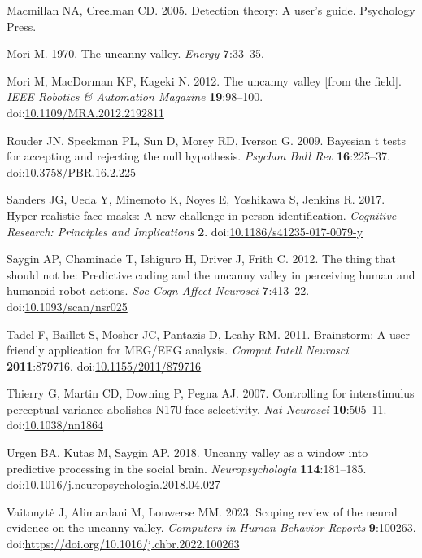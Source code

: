 \documentclass[
]{article}
\newlength{\cslhangindent}
\newlength{\cslentryspacingunit} %
\newenvironment{CSLReferences}[2] %
 {%
  \setlength{\parindent}{0pt}
  \ifodd #1
  \let\oldpar\par
  \def\par{\hangindent=\cslhangindent\oldpar}
  \fi
  \setlength{\parskip}{#2\cslentryspacingunit}
 }%
 {}
\begin{document}
\begin{CSLReferences}{1}{0}
\leavevmode{}%
Macmillan NA, Creelman CD. 2005. Detection theory: A user's guide. Psychology Press.

\leavevmode{}%
Mori M. 1970. The uncanny valley. \emph{Energy} \textbf{7}:33--35.

\leavevmode{}%
Mori M, MacDorman KF, Kageki N. 2012. The uncanny valley {[}from the field{]}. \emph{IEEE Robotics \& Automation Magazine} \textbf{19}:98--100. doi:\href{https://doi.org/10.1109/MRA.2012.2192811}{10.1109/MRA.2012.2192811}

\leavevmode{}%
Rouder JN, Speckman PL, Sun D, Morey RD, Iverson G. 2009. Bayesian t tests for accepting and rejecting the null hypothesis. \emph{Psychon Bull Rev} \textbf{16}:225--37. doi:\href{https://doi.org/10.3758/PBR.16.2.225}{10.3758/PBR.16.2.225}

\leavevmode{}%
Sanders JG, Ueda Y, Minemoto K, Noyes E, Yoshikawa S, Jenkins R. 2017. Hyper-realistic face masks: A new challenge in person identification. \emph{Cognitive Research: Principles and Implications} \textbf{2}. doi:\href{https://doi.org/10.1186/s41235-017-0079-y}{10.1186/s41235-017-0079-y}

\leavevmode{}%
Saygin AP, Chaminade T, Ishiguro H, Driver J, Frith C. 2012. The thing that should not be: Predictive coding and the uncanny valley in perceiving human and humanoid robot actions. \emph{Soc Cogn Affect Neurosci} \textbf{7}:413--22. doi:\href{https://doi.org/10.1093/scan/nsr025}{10.1093/scan/nsr025}

\leavevmode{}%
Tadel F, Baillet S, Mosher JC, Pantazis D, Leahy RM. 2011. Brainstorm: A user-friendly application for MEG/EEG analysis. \emph{Comput Intell Neurosci} \textbf{2011}:879716. doi:\href{https://doi.org/10.1155/2011/879716}{10.1155/2011/879716}

\leavevmode{}%
Thierry G, Martin CD, Downing P, Pegna AJ. 2007. Controlling for interstimulus perceptual variance abolishes N170 face selectivity. \emph{Nat Neurosci} \textbf{10}:505--11. doi:\href{https://doi.org/10.1038/nn1864}{10.1038/nn1864}

\leavevmode{}%
Urgen BA, Kutas M, Saygin AP. 2018. Uncanny valley as a window into predictive processing in the social brain. \emph{Neuropsychologia} \textbf{114}:181--185. doi:\href{https://doi.org/10.1016/j.neuropsychologia.2018.04.027}{10.1016/j.neuropsychologia.2018.04.027}

\leavevmode{}%
Vaitonytė J, Alimardani M, Louwerse MM. 2023. Scoping review of the neural evidence on the uncanny valley. \emph{Computers in Human Behavior Reports} \textbf{9}:100263. doi:\url{https://doi.org/10.1016/j.chbr.2022.100263}

\end{CSLReferences}
\end{document}
